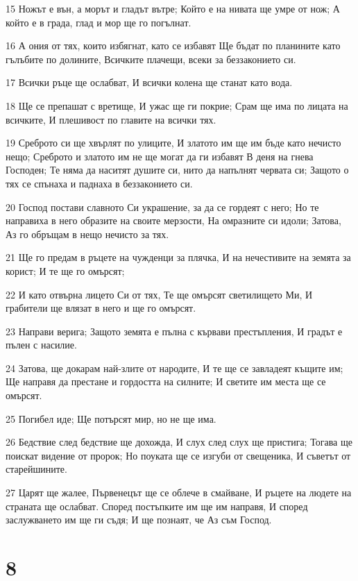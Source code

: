 \par 15 Ножът е вън, а морът и гладът вътре; Който е на нивата ще умре от нож; А който е в града, глад и мор ще го погълнат.
\par 16 А ония от тях, които избягнат, като се избавят Ще бъдат по планините като гълъбите по долините, Всичките плачещи, всеки за беззаконието си.
\par 17 Всички ръце ще ослабват, И всички колена ще станат като вода.
\par 18 Ще се препашат с вретище, И ужас ще ги покрие; Срам ще има по лицата на всичките, И плешивост по главите на всички тях.
\par 19 Среброто си ще хвърлят по улиците, И златото им ще им бъде като нечисто нещо; Среброто и златото им не ще могат да ги избавят В деня на гнева Господен; Те няма да наситят душите си, нито да напълнят червата си; Защото о тях се спънаха и паднаха в беззаконието си.
\par 20 Господ постави славното Си украшение, за да се гордеят с него; Но те направиха в него образите на своите мерзости, На омразните си идоли; Затова, Аз го обръщам в нещо нечисто за тях.
\par 21 Ще го предам в ръцете на чужденци за плячка, И на нечестивите на земята за корист; И те ще го омърсят;
\par 22 И като отвърна лицето Си от тях, Те ще омърсят светилището Ми, И грабители ще влязат в него и ще го омърсят.
\par 23 Направи верига; Защото земята е пълна с кървави престъпления, И градът е пълен с насилие.
\par 24 Затова, ще докарам най-злите от народите, И те ще се завладеят къщите им; Ще направя да престане и гордостта на силните; И светите им места ще се омърсят.
\par 25 Погибел иде; Ще потърсят мир, но не ще има.
\par 26 Бедствие след бедствие ще дохожда, И слух след слух ще пристига; Тогава ще поискат видение от пророк; Но поуката ще се изгуби от свещеника, И съветът от старейшините.
\par 27 Царят ще жалее, Първенецът ще се облече в смайване, И ръцете на людете на страната ще ослабват. Според постъпките им ще им направя, И според заслужването им ще ги съдя; И ще познаят, че Аз съм Господ.

\chapter{8}

